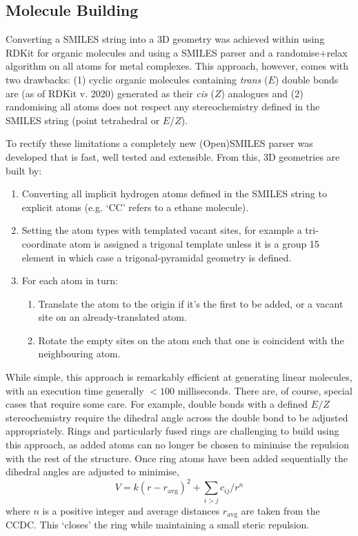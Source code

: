 \documentclass[../../main.tex]{subfiles}
\begin{document}
\subsection{Molecule Building}

Converting a SMILES string into a 3D geometry was achieved within \ade using RDKit\cite{Landrum2019} for organic molecules and using a SMILES parser and a randomise+relax algorithm on all atoms for metal complexes. This approach, however, comes with two drawbacks: (1) cyclic organic molecules containing \emph{trans} ($E$) double bonds are (as of RDKit v. 2020) generated as their \emph{cis} ($Z$) analogues and (2) randomising all atoms does not respect any stereochemistry defined in the SMILES string (point tetrahedral or $E$/$Z$).

To rectify these limitations a completely new (Open)SMILES parser was developed that is fast, well tested and extensible. From this, 3D geometries are built by:

\begin{enumerate}
	\item Converting all implicit hydrogen atoms defined in the SMILES string to explicit atoms (e.g. `CC' refers to a ethane molecule).
	\item Setting the atom types with templated vacant sites, for example a tri-coordinate atom is assigned a trigonal template unless it is a group 15 element in which case a trigonal-pyramidal geometry is defined. 
	\item For each atom in turn:
	\begin{enumerate}
		\item Translate the atom to the origin if it's the first to be added, or a vacant site on an already-translated atom.
		\item Rotate the empty sites on the atom such that one is coincident with the neighbouring atom.
	\end{enumerate}
\end{enumerate}

While simple, this approach is remarkably efficient at generating linear molecules, with an execution time generally $<100$ milliseconds. There are, of course, special cases that require some care. For example, double bonds with a defined $E/Z$ stereochemistry require the dihedral angle across the double bond to be adjusted appropriately. Rings and particularly fused rings are challenging to build using this approach, as added atoms can no longer be chosen to minimise the repulsion with the rest of the structure. Once ring atoms have been added sequentially the dihedral angles are adjusted to minimise,
\begin{equation}
	V = k(r-r_\text{avg})^2 + \sum_{i>j} {c_{ij}}/{r^n}
\end{equation}
where $n$ is a positive integer and average distances $r_\text{avg}$ are taken from the CCDC. This `closes' the ring while maintaining a small steric repulsion. 
\end{document}
